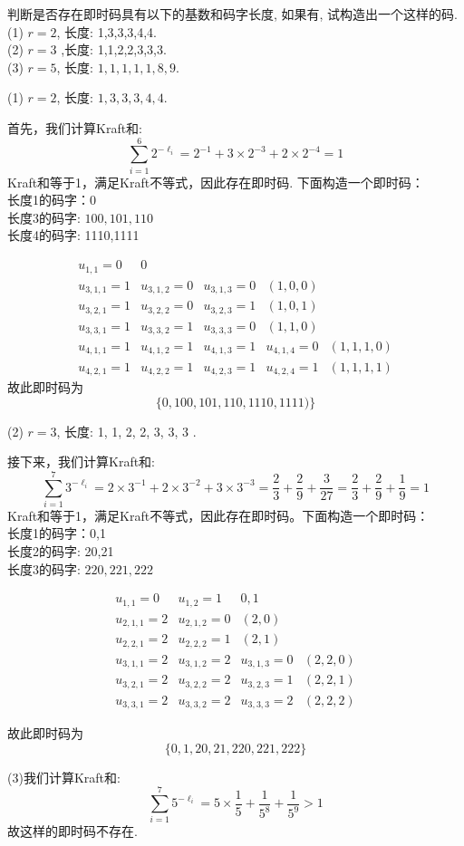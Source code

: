 \begin{tcolorbox}[breakable,colback=blue!5!white,colframe=blue!75!black,
 title= 解答题]
 
判断是否存在即时码具有以下的基数和码字长度, 如果有, 试构造出一个这样的码.\\
(1) $ r=2 $, 长度: 1,3,3,3,4,4.\\
(2) $ r=3 $ ,长度: 1,1,2,2,3,3,3.\\
(3) $ r=5 $, 长度: $ 1,1,1,1,1,8,9 $.


\tcblower

(1) $ r=2 $, 长度: $ 1,3,3,3,4,4 $.

首先，我们计算Kraft和:
$$
\sum_{i=1}^{6} 2^{-\ell_{i}}=2^{-1}+3 \times 2^{-3}+2 \times 2^{-4}=1
$$
Kraft和等于1，满足Kraft不等式，因此存在即时码. 下面构造一个即时码：\\
长度1的码字：0\\
 长度3的码字: $ 100,101,110 $\\
 长度4的码字: 1110,1111

 $$
\begin{array}{lllll}
u_{1,1}=0 & 0 & & &\\
u_{3,1,1}=1 & u_{3,1,2}=0 & u_{3,1,3}=0 & (1,0,0) &\\
u_{3,2,1}=1 & u_{3,2,2}=0 & u_{3,2,3}=1 & (1,0,1) &\\
u_{3,3,1}=1 & u_{3,3,2}=1 & u_{3,3,3}=0 & (1,1,0) &\\
u_{4,1,1}=1 & u_{4,1,2}=1 & u_{4,1,3}=1 & u_{4,1,4}=0 & (1,1,1,0)\\
u_{4,2,1}=1 & u_{4,2,2}=1 & u_{4,2,3}=1 & u_{4,2,4}=1& (1,1,1,1)
\end{array}
$$
故此即时码为
$$
\{0,100,101,110,1110,1111)\}
$$

(2) $ r=3 $, 长度: 1, 1, 2, 2, 3, 3, 3 .

接下来，我们计算Kraft和:
$$
\sum_{i=1}^{7} 3^{-\ell_{i}}=2 \times 3^{-1}+2 \times 3^{-2}+3 \times 3^{-3}=\frac{2}{3}+\frac{2}{9}+\frac{3}{27}=\frac{2}{3}+\frac{2}{9}+\frac{1}{9}=1
$$
Kraft和等于1，满足Kraft不等式，因此存在即时码。下面构造一个即时码：\\
长度1的码字：0,1\\
长度2的码字: 20,21\\
长度3的码字: $ 220,221,222 $

$$
\begin{array}{llrl}
u_{1,1}=0 & u_{1,2}=1 & 0,1&\\
u_{2,1,1}=2 & u_{2,1,2}=0 & (2,0) & \\
u_{2,2,1}=2 & u_{2,2,2}=1 & (2,1) & \\
u_{3,1,1}=2 & u_{3,1,2}=2 & u_{3,1,3}=0 & (2,2,0) \\
u_{3,2,1}=2 & u_{3,2,2}=2 & u_{3,2,3}=1 & (2,2,1) \\
u_{3,3,1}=2 & u_{3,3,2}=2 & u_{3,3,3}=2 & (2,2,2)
\end{array}
$$

故此即时码为
$$
\{0,1,20,21,220,221,222\}
$$

(3)我们计算Kraft和:
$$
\sum_{i=1}^{7} 5^{-\ell_{i}} =5 \times \frac{1}{5}+\frac{1}{5^{8}}+\frac{1}{5^{9}}>1
$$
故这样的即时码不存在.


\end{tcolorbox}



